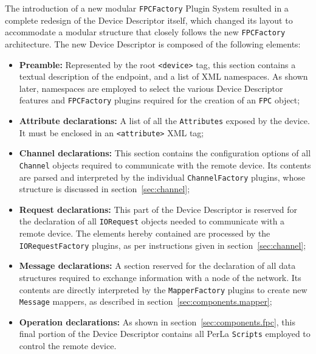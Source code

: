 The introduction of a new modular \texttt{FPCFactory} Plugin System resulted in
a complete redesign of the Device Descriptor itself, which changed its layout
to accommodate a modular structure that closely follows the new
\texttt{FPCFactory} architecture. The new Device Descriptor is composed of the
following elements:

\begin{itemize}

    \item \textbf{Preamble:} Represented by the root \lstinline!<device>! tag,
        this section contains a textual description of the endpoint, and a list
        of XML namespaces. As shown later, namespaces are employed to select
        the various Device Descriptor features and \texttt{FPCFactory} plugins
        required for the creation of an \texttt{FPC} object;

    \item \textbf{Attribute declarations:} A list of all the
        \texttt{Attributes} exposed by the device. It must be enclosed in an
        \lstinline!<attribute>! XML tag;

    \item \textbf{Channel declarations:} This section contains the
        configuration options of all \texttt{Channel} objects required to
        communicate with the remote device. Its contents are parsed and
        interpreted by the individual \texttt{ChannelFactory} plugins, whose
        structure is discussed in section~\ref{sec:channel};

    \item \textbf{Request declarations:} This part of the Device Descriptor is
        reserved for the declaration of all \texttt{IORequest} objects needed
        to communicate with a remote device. The elements hereby contained are
        processed by the \texttt{IORequestFactory} plugins, as per instructions
        given in section~\ref{sec:channel};

    \item \textbf{Message declarations:} A section reserved for the declaration
        of all data structures required to exchange information with a node of
        the network. Its contents are directly interpreted by the
        \texttt{MapperFactory} plugins to create new \texttt{Message}
        mappers, as described in section~\ref{sec:components.mapper};

    \item \textbf{Operation declarations:} As shown in
        section~\ref{sec:components.fpc}, this final portion of the Device
        Descriptor contains all PerLa \texttt{Scripts} employed to control the
        remote device.

\end{itemize}

